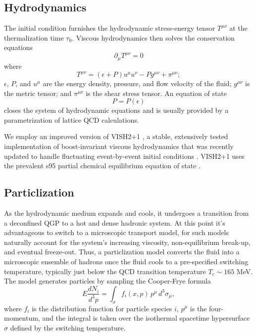 \documentclass[aps,prc,reprint,superscriptaddress,amsmath]{revtex4-1}
\begin{document}
\subsection{Hydrodynamics}

The initial condition furnishes the hydrodynamic stress-energy tensor $T^{\mu\nu}$ at the thermalization time $\tau_0$.
Viscous hydrodynamics then solves the conservation equations
\begin{equation}
  \partial_\mu T^{\mu\nu} = 0
\end{equation}
where
\begin{equation}
  T^{\mu\nu} = (\epsilon + P) u^\mu u^\nu - P g^{\mu\nu} + \pi^{\mu\nu};
\end{equation}
$\epsilon$, $P$, and $u^\mu$ are the energy density, pressure, and flow velocity of the fluid; $g^{\mu\nu}$ is the metric tensor; and $\pi^{\mu\nu}$ is the shear stress tensor.
An equation of state
\begin{equation}
  P = P(\epsilon)
\end{equation}
closes the system of hydrodynamic equations and is usually provided by a parametrization of lattice QCD calculations.

We employ an improved version of \small{VISH2+1} \cite{Song:2007ux}, a stable, extensively tested implementation of boost-invariant viscous hydrodynamics that was recently updated to handle fluctuating event-by-event initial conditions \cite{Shen:2014vra}.
\small{VISH2+1} uses the prevalent s95 partial chemical equilibrium equation of state \cite{Huovinen:2009yb}.

\subsection{Particlization}

As the hydrodynamic medium expands and cools, it undergoes a transition from a deconfined QGP to a hot and dense hadronic system.
At this point it's advantageous to switch to a microscopic transport model, for such models naturally account for the system's increasing viscosity, non-equilibrium break-up, and eventual freeze-out.
Thus, a particlization model converts the fluid into a microscopic ensemble of hadrons once the fluid cools to a pre-specified switching temperature, typically just below the QCD transition temperature $T_c \sim 165$ MeV.
The model generates particles by sampling the Cooper-Frye formula \cite{Cooper:1974mv}
\begin{equation}
  E \frac{dN_i}{d^3p} = \int_\sigma f_i(x,p) \, p^\mu \, d^3\sigma_\mu,
\end{equation}
where $f_i$ is the distribution function for particle species $i$, $p^\mu$ is the four-momentum, and the integral is taken over the isothermal spacetime hypersurface $\sigma$ defined by the switching temperature.
\end{document}
